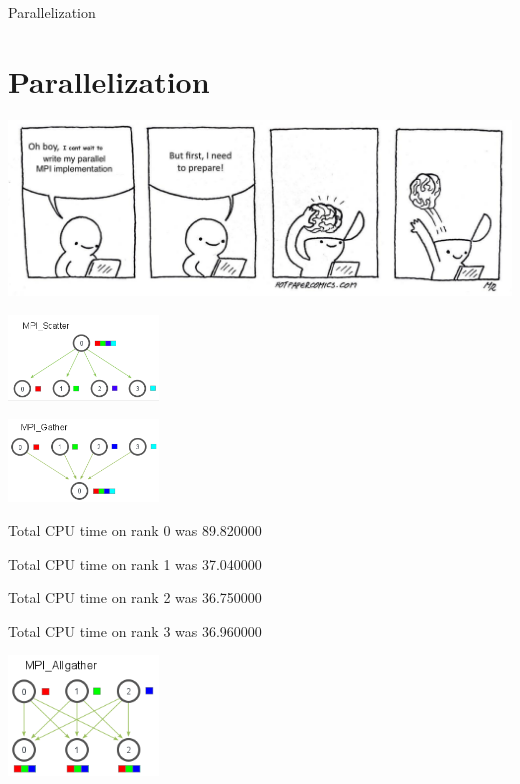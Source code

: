 \documentclass{beamer}
\begin{document}
\begin{frame}[allowframebreaks]{Parallelization}
\section{Parallelization}

\includegraphics[width=\textwidth]{brain}

\framebreak



\includegraphics[width=4cm]{mpi_scatter}

\framebreak



\includegraphics[width=4cm]{mpi_gather}

\framebreak

Total CPU time on rank 0 was 89.820000

Total CPU time on rank 1 was 37.040000

Total CPU time on rank 2 was 36.750000

Total CPU time on rank 3 was 36.960000

\framebreak

\includegraphics[width=4cm]{mpi_allgather}



\end{frame}
\end{document}
